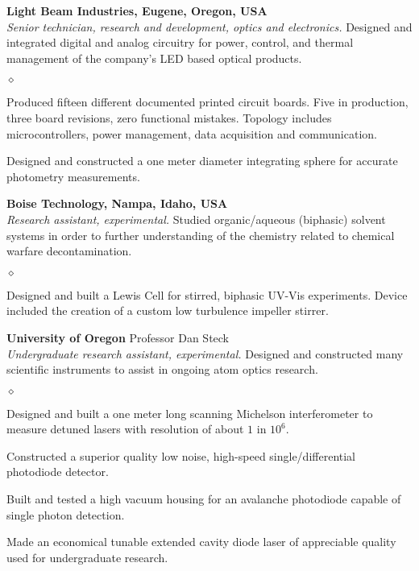 \documentclass{webster-resume}
\newenvironment{list3}{
  \begin{list}{$\diamond$}{%
      \setlength{\itemsep}{-0.05in}
      \setlength{\parsep}{.05in} \setlength{\parskip}{0in}
      \setlength{\topsep}{0in} \setlength{\partopsep}{0in} 
      \setlength{\leftmargin}{0.2in}}}{\end{list}}
\begin{document}
\begin{resitem}[2007-2009]
{\bf Light Beam Industries, Eugene, Oregon, USA}\\
\textsl{Senior technician, research and development, optics and electronics.}  Designed and
integrated digital and analog circuitry for power, control, and thermal
management of the company's LED based optical products.  
\begin{list3}
\item Produced fifteen different documented printed circuit boards.  Five
in production, three board revisions, zero functional mistakes.  Topology includes microcontrollers,
power management, data acquisition and communication.
\item Designed and constructed a one meter diameter integrating sphere for accurate
photometry measurements.
\end{list3}
\end{resitem}

\begin{resitem}[2007]
{\bf Boise Technology, Nampa, Idaho, USA}\\
\textsl{Research assistant, experimental.}  Studied organic/aqueous (biphasic) solvent systems in
order to further understanding of the chemistry related to chemical warfare
decontamination.
\begin{list3}
\item Designed and built a Lewis Cell for stirred, biphasic UV-Vis
experiments.  Device included the creation of a custom low turbulence
impeller stirrer.
\end{list3}
\end{resitem}

\begin{resitem}[2005-2007]
{\bf University of Oregon} Professor Dan Steck\\
\textsl{Undergraduate research assistant, experimental.}
Designed and constructed many scientific instruments to assist in ongoing
atom optics research.
\begin{list3}
\item Designed and built a one meter long scanning Michelson interferometer to measure
detuned lasers with resolution of about $1$ in $10^{6}$. 
\item Constructed a superior quality low noise, high-speed single/differential
photodiode detector.
\item Built and tested a high vacuum housing for an avalanche photodiode
capable of single photon detection.
\item Made an economical tunable extended cavity diode laser of appreciable quality used for
undergraduate research.  
\end{list3}
\end{resitem}
\end{document}
